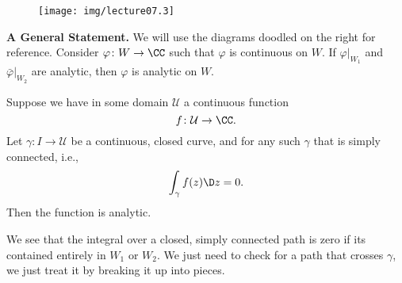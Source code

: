 \begin{wrapfigure}[5]{r}{1.25in}
\vspace{-30pt}
\begin{center}
\texttt{[image: img/lecture07.3]}
\end{center}
\vspace{-20pt}
\end{wrapfigure}
\medbreak\noindent\textbf{A General Statement.\enspace}
We will use the diagrams doodled on the right for reference.
Consider $\varphi\colon W\to\CC$ such that $\varphi$ is
continuous on $W$. If $\varphi|_{W_{1}}$ and
$\bar{\varphi}|_{W_{2}}$ are analytic, then $\varphi$ is analytic
on $W$.

\begin{lem}
Suppose we have in some domain $\mathcal{U}$ a continuous
function $$f\colon\mathcal{U}\to\CC.$$ Let $\gamma\colon
I\to\mathcal{U}$ be a continuous, closed curve, and for any such $\gamma$
that is simply connected, i.e., $$\int_{\gamma}f(z)\D z=0.$$ Then the
function is analytic.
\end{lem}

We see that the integral over a closed, simply connected path is
zero if its contained entirely in $W_{1}$ or $W_{2}$. We just
need to check for a path that crosses $\gamma$, we just treat it
by breaking it up into pieces.
